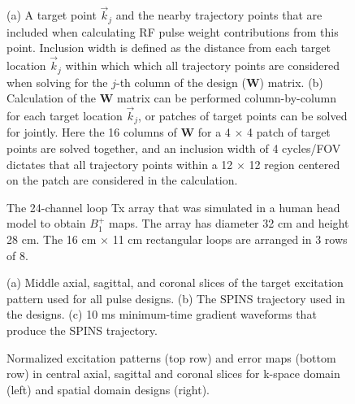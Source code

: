 \documentclass[11pt]{article}
\renewcommand{\textcolor}[1]{}
\begin{document}


\pagebreak

\begin{figure}
	\centering
	\caption{(a) A target point $\vec{k}_j$ and the nearby trajectory points that are included when calculating 
	RF pulse weight contributions from this point.
	Inclusion width is defined as the distance from each target location $\vec{k}_j$ within which 
	which all trajectory points are considered when solving for the $j$-th column of the design ($\bm{W}$) matrix.
	(b) Calculation of the $\bm{W}$ matrix can be performed column-by-column for each target location $\vec{k}_j$,
	or patches of target points can be solved for jointly. 
	Here the 16 columns of $\bm{W}$ for a 4 $\times$ 4 patch of target points are solved together,
	and an inclusion width of 4 cycles/FOV dictates that all trajectory points within a 12 $\times$ 12 region
	centered on the patch are considered in the calculation.}
	\label{fig:Patch}
\end{figure}

\begin{figure}
	\centering
	\caption{The 24-channel loop Tx array that was simulated in a human head model to obtain $B_1^+$ maps. 
	The array has diameter 32 cm and height 28 cm. The 16 cm $\times$ 11 cm rectangular loops are arranged in 3 rows of 8.}
	\label{fig:Coil}
\end{figure}

\begin{figure}
	\centering
	\caption{(a) Middle axial, sagittal, and coronal slices of the target excitation pattern used for all pulse designs. 
	(b) The SPINS trajectory used in the designs. 
	(c) 10 ms minimum-time gradient waveforms that produce the SPINS trajectory.}
	\label{fig:Target}
\end{figure}

\begin{figure}
	\centering
	\caption{ %
	Normalized excitation patterns (top row) and error maps (bottom row) in central axial, sagittal and coronal slices 
	for k-space domain (left) and spatial domain designs (right).}
	\label{fig:ErrorMap}
\end{figure}
\end{document}
